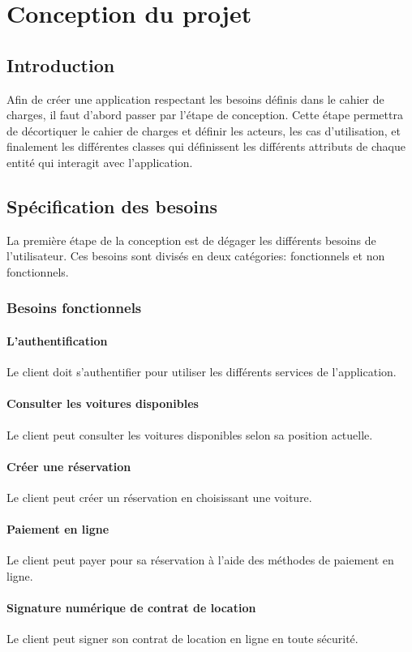 \chapter{Conception du projet}
\minitoc
\clearpage
\section*{Introduction}
Afin de créer une application respectant les besoins définis dans le cahier de charges, il faut d'abord passer par l'étape de conception. Cette étape permettra de décortiquer le cahier de charges et définir les acteurs, les cas d'utilisation, et finalement les différentes classes qui définissent les différents attributs de chaque entité qui interagit avec l'application.
\section{Spécification des besoins}
La première étape de la conception est de dégager les différents besoins de l'utilisateur. Ces besoins sont divisés en deux catégories: fonctionnels et non fonctionnels.
\subsection{Besoins fonctionnels}
\subsubsection{L'authentification}
Le client doit s'authentifier pour utiliser les différents services de l'application.
\subsubsection{Consulter les voitures disponibles}
Le client peut consulter les voitures disponibles selon sa position actuelle.
\subsubsection{Créer une réservation}
Le client peut créer un réservation en choisissant une voiture.
\subsubsection{Paiement en ligne}
Le client peut payer pour sa réservation à l'aide des méthodes de paiement en ligne.
\subsubsection{Signature numérique de contrat de location}
Le client peut signer son contrat de location en ligne en toute sécurité.
